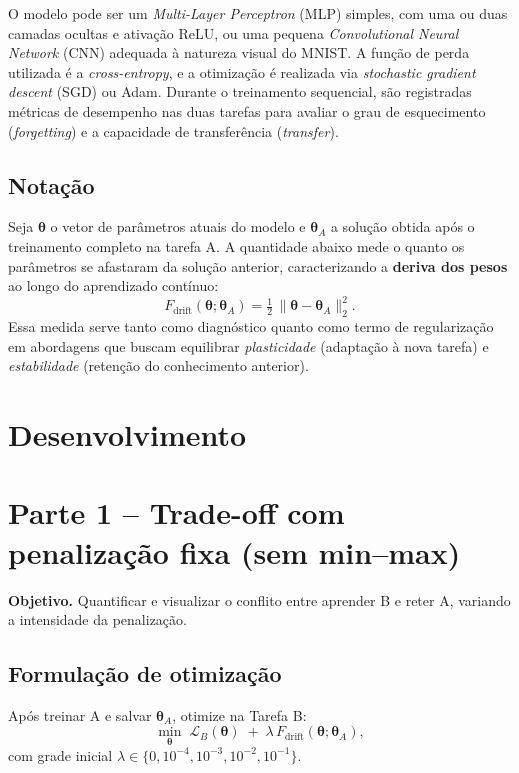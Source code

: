 \documentclass[9pt,a4paper]{extarticle}
\begin{document}
O modelo pode ser um \textit{Multi-Layer Perceptron} (MLP) simples, com uma ou duas camadas ocultas e ativação ReLU, 
ou uma pequena \textit{Convolutional Neural Network} (CNN) adequada à natureza visual do MNIST. 
A função de perda utilizada é a \textit{cross-entropy}, 
e a otimização é realizada via \textit{stochastic gradient descent} (SGD) ou Adam.  
Durante o treinamento sequencial, são registradas métricas de desempenho nas duas tarefas 
para avaliar o grau de esquecimento (\textit{forgetting}) e a capacidade de transferência (\textit{transfer}).

\subsection*{Notação}

Seja $\bm{\theta}$ o vetor de parâmetros atuais do modelo e $\bm{\theta}_A$ 
a solução obtida após o treinamento completo na tarefa A.  
A quantidade abaixo mede o quanto os parâmetros se afastaram da solução anterior, 
caracterizando a \textbf{deriva dos pesos} ao longo do aprendizado contínuo:
\[
F_{\text{drift}}(\bm{\theta};\bm{\theta}_A)
= \tfrac{1}{2}\,\|\bm{\theta}-\bm{\theta}_A\|_2^2.
\]
Essa medida serve tanto como diagnóstico quanto como termo de regularização 
em abordagens que buscam equilibrar \textit{plasticidade} (adaptação à nova tarefa) 
e \textit{estabilidade} (retenção do conhecimento anterior).

\section{Desenvolvimento}

\section*{Parte 1 -- Trade-off com penalização fixa (sem min--max)}
\textbf{Objetivo.} Quantificar e visualizar o conflito entre aprender B e reter A, variando a intensidade da penalização.

\subsection*{Formulação de otimização}
Após treinar A e salvar $\bm{\theta}_A$, otimize na Tarefa B:
\[
\min_{\bm{\theta}}\; \mathcal{L}_B(\bm{\theta}) \;+\; \lambda\,F_{\text{drift}}(\bm{\theta};\bm{\theta}_A),
\]
com grade inicial $\lambda \in \{0,10^{-4},10^{-3},10^{-2},10^{-1}\}$.
\end{document}
